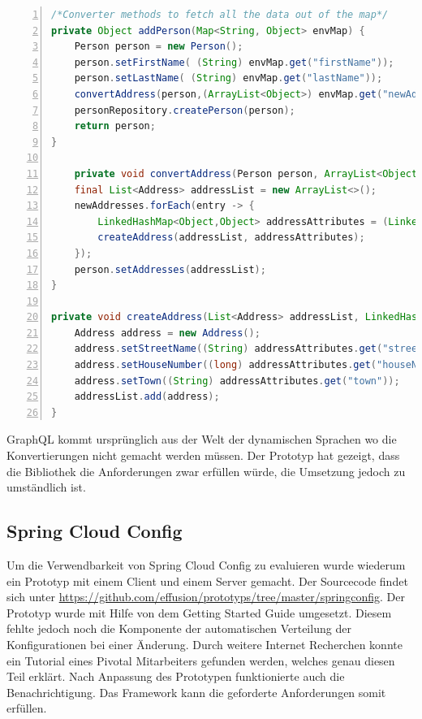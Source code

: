 \begin{lstlisting}[language=Java, showspaces=false, basicstyle=\ttfamily, numbers=left, numberstyle=\tiny, commentstyle=\color{gray}]
/*Converter methods to fetch all the data out of the map*/
private Object addPerson(Map<String, Object> envMap) {
	Person person = new Person();
	person.setFirstName( (String) envMap.get("firstName"));
	person.setLastName( (String) envMap.get("lastName"));
	convertAddress(person,(ArrayList<Object>) envMap.get("newAddresses"));
	personRepository.createPerson(person);
	return person;
}

	private void convertAddress(Person person, ArrayList<Object> newAddresses) {
	final List<Address> addressList = new ArrayList<>();
	newAddresses.forEach(entry -> {
		LinkedHashMap<Object,Object> addressAttributes = (LinkedHashMap<Object,Object>) entry;
		createAddress(addressList, addressAttributes);
	});
	person.setAddresses(addressList);
}

private void createAddress(List<Address> addressList, LinkedHashMap<Object,Object> addressAttributes) {
	Address address = new Address();
	address.setStreetName((String) addressAttributes.get("streetName"));
	address.setHouseNumber((long) addressAttributes.get("houseNumber"));
	address.setTown((String) addressAttributes.get("town"));
	addressList.add(address);
}
\end{lstlisting}
GraphQL kommt ursprünglich aus der Welt der dynamischen Sprachen wo die Konvertierungen nicht gemacht werden müssen. Der Prototyp hat gezeigt, dass die Bibliothek die Anforderungen zwar erfüllen würde, die Umsetzung jedoch zu umständlich ist.

\subsection{Spring Cloud Config}

Um die Verwendbarkeit von Spring Cloud Config zu evaluieren wurde wiederum ein Prototyp mit einem Client und einem Server gemacht. Der Sourcecode findet sich unter \url{https://github.com/effusion/prototyps/tree/master/springconfig}. Der Prototyp wurde mit Hilfe von dem Getting Started Guide \cite{gsspringcloudconfig} umgesetzt. Diesem fehlte jedoch noch die Komponente der automatischen Verteilung der Konfigurationen bei einer Änderung. Durch weitere Internet Recherchen konnte ein Tutorial \cite{springcloudpush} eines Pivotal Mitarbeiters gefunden werden, welches genau diesen Teil erklärt. Nach Anpassung des Prototypen funktionierte auch die Benachrichtigung.
Das Framework kann die geforderte Anforderungen somit erfüllen.

